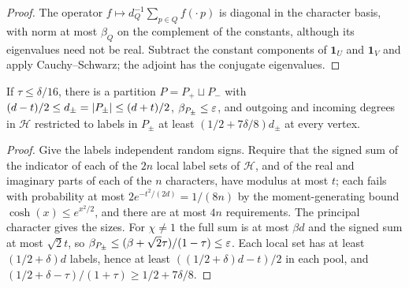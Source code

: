 \begin{proof}
The operator $f\mapsto d_Q^{-1}\sum_{p\in Q}f(\cdot\,p)$ is diagonal in the character basis, with norm at most
$\beta_Q$ on the complement of the constants, although its eigenvalues need not be real. Subtract the
constant components of $\mathbf 1_U$ and $\mathbf 1_V$ and apply Cauchy--Schwarz; the adjoint has the
conjugate eigenvalues.
\end{proof}

\begin{lemma}\label{dir:lem:routesplit}
If $\tau\le\delta/16$, there is a partition $P=P_+\sqcup P_-$ with $(d-t)/2\le d_\pm=\lvert P_\pm\rvert\le(d+t)/2$,
$\beta_{P_\pm}\le\varepsilon$, and outgoing and incoming degrees in $\mathcal H$ restricted to labels in $P_\pm$ at
least $(1/2+7\delta/8)d_\pm$ at every vertex.
\end{lemma}

\begin{proof}
Give the labels independent random signs. Require that the signed sum of the indicator of each of the
$2n$ local label sets of $\mathcal H$, and of the real and imaginary parts of each of the $n$ characters,
have modulus at most $t$; each fails with probability at most $2e^{-t^2/(2d)}=1/(8n)$ by the
moment-generating bound $\cosh(x)\le e^{x^2/2}$, and there are at most $4n$ requirements. The principal
character gives the sizes. For $\chi\ne1$ the full sum is at most $\beta d$ and the signed sum at most
$\sqrt2t$, so $\beta_{P_\pm}\le(\beta+\sqrt2\tau)/(1-\tau)\le\varepsilon$. Each local set has at least
$(1/2+\delta)d$ labels, hence at least $((1/2+\delta)d-t)/2$ in each pool, and
$(1/2+\delta-\tau)/(1+\tau)\ge1/2+7\delta/8$.
\end{proof}

